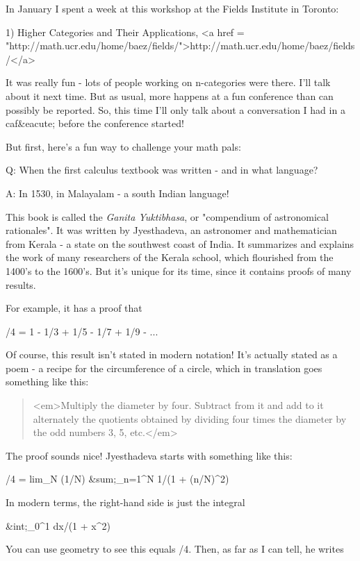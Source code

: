 


In January I spent a week at this workshop at the Fields Institute
in Toronto:

1) Higher Categories and Their Applications, <a href =
"http://math.ucr.edu/home/baez/fields/">http://math.ucr.edu/home/baez/fields/</a>

It was really fun - lots of people working on n-categories were there.
I'll talk about it next time.  But as usual, more happens at a fun
conference than can possibly be reported.  So, this time I'll only
talk about a conversation I had in a caf&eacute; before the conference
started!

But first, here's a fun way to challenge your math pals:

Q: When the first calculus textbook was written - and in what 
language?

A: In 1530, in Malayalam - a south Indian language!  

This book is called the \emph{Ganita Yuktibhasa}, or
"compendium of astronomical rationales".  It was written by
Jyesthadeva, an astronomer and mathematician from Kerala - a state on
the southwest coast of India.  It summarizes and explains the work of
many researchers of the Kerala school, which flourished from the
1400's to the 1600's.  But it's unique for its time, since it contains
proofs of many results.

For example, it has a proof that

\pi /4 = 1 - 1/3 + 1/5 - 1/7 + 1/9 - ...

Of course, this result isn't stated in modern notation!  It's
actually stated as a poem - a recipe for the circumference of 
a circle, which in translation goes something like this:

\begin{quote}
 <em>Multiply the diameter by four.  Subtract from it and add to it
 alternately the quotients obtained by dividing four times the 
 diameter by the odd numbers 3, 5, etc.</em>
\end{quote}
    

The proof sounds nice!  Jyesthadeva starts with something like this:

\pi /4 = lim_{N \to  \infty } (1/N) &sum;_{n=1}^{N} 1/(1 + (n/N)^{2})

In modern terms, the right-hand side is just the integral

&int;_{0}^{1} dx/(1 + x^{2}) 
 
You can use geometry to see this equals \pi /4.  Then, as far as 
I can tell, he writes

